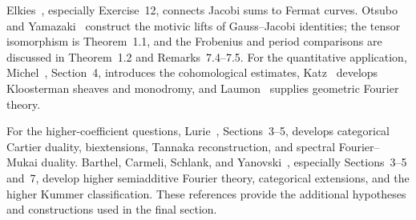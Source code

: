 \documentclass[11pt]{article}
\theoremstyle{remark}
\begin{document}
Elkies~\cite{elkies-gauss}, especially Exercise~12, connects Jacobi sums to Fermat curves. Otsubo and Yamazaki~\cite{otsubo-yamazaki} construct the motivic lifts of Gauss--Jacobi identities; the tensor isomorphism is Theorem~1.1, and the Frobenius and period comparisons are discussed in Theorem~1.2 and Remarks~7.4--7.5. For the quantitative application, Michel~\cite{michel-applied}, Section~4, introduces the cohomological estimates, Katz~\cite{katz} develops Kloosterman sheaves and monodromy, and Laumon~\cite{laumon} supplies geometric Fourier theory.

For the higher-coefficient questions, Lurie~\cite{lurie-elliptic}, Sections~3--5, develops categorical Cartier duality, biextensions, Tannaka reconstruction, and spectral Fourier--Mukai duality. Barthel, Carmeli, Schlank, and Yanovski~\cite{chromatic}, especially Sections~3--5 and~7, develop higher semiadditive Fourier theory, categorical extensions, and the higher Kummer classification. These references provide the additional hypotheses and constructions used in the final section.
\end{document}
